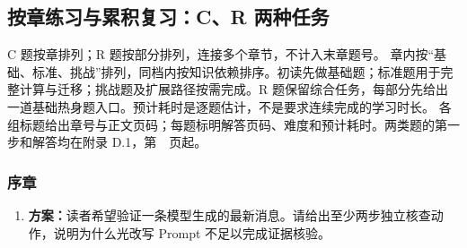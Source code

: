 \subsection{按章练习与累积复习：C、R 两种任务}
\label{app:exercise-bank}
C 题按章排列；R 题按部分排列，连接多个章节，不计入末章题号。
章内按“基础、标准、挑战”排列，同档内按知识依赖排序。初读先做基础题；标准题用于完整计算与迁移；挑战题及扩展路径按需完成。R 题保留综合任务，每部分先给出一道基础热身题入口。预计耗时是逐题估计，不是要求连续完成的学习时长。
各组标题给出章号与正文页码；每题标明解答页码、难度和预计耗时。两类题的第一步和解答均在附录 D.1，第~\pageref*{app:answers}~页起。
\subsubsection*{序章}
\begin{enumerate}[label={},leftmargin=4.8em,itemsep=4pt]
\item[\textbf{C-001.}] \leavevmode{}\label{exercise:C-001}\label{exercise:verify-generated-news}\textbf{方案：}读者希望验证一条模型生成的最新消息。请给出至少两步独立核查动作，说明为什么光改写 Prompt 不足以完成证据核验。
\end{enumerate}
